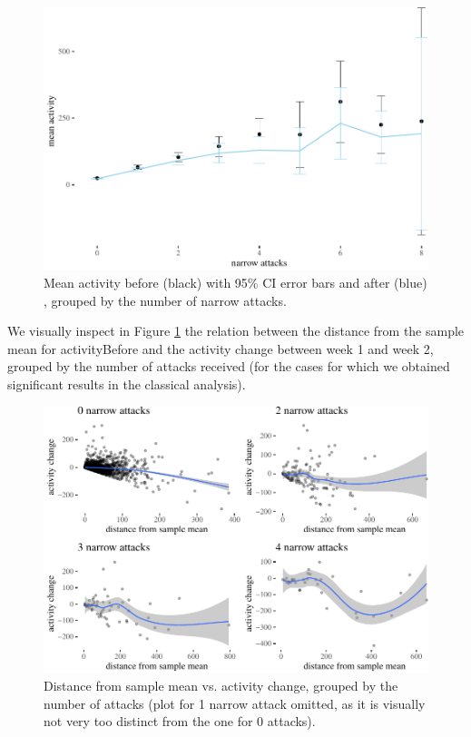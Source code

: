 \documentclass[10pt,]{scrartcl}
\begin{document}
\begin{figure}

\begin{center}\includegraphics[width=1\linewidth]{redditAnalysisWalkthrough_files/figure-latex/unnamed-chunk-104-1} \end{center}
\caption{Mean activity before (black) with 95\% CI error bars and after (blue) , grouped by the number of narrow attacks.}
\end{figure}

We visually inspect in Figure \ref{fig:regression} the relation between
the distance from the sample mean for \textsf{activityBefore} and the
activity change between week 1 and week 2, grouped by the number of
attacks received (for the cases for which we obtained significant
results in the classical analysis).

\begin{figure}

\begin{center}\includegraphics[width=1\linewidth]{redditAnalysisWalkthrough_files/figure-latex/unnamed-chunk-105-1} \end{center}
\caption{Distance from sample mean vs. activity change, grouped by the number of attacks (plot for 1 narrow attack omitted, as it is visually not very too distinct from the one for 0 attacks).}
\label{fig:regression}
\end{figure}
\end{document}
